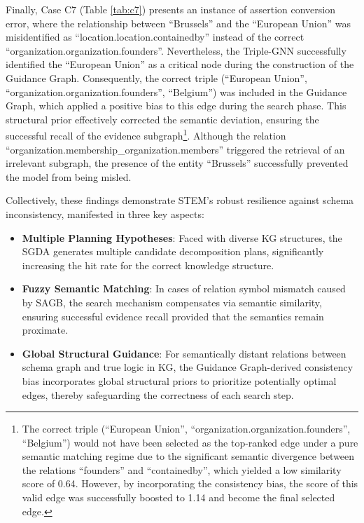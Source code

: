 \documentclass[11pt]{article}
\begin{document}
Finally, Case C7 (Table \ref{tab:c7}) presents an instance of assertion conversion error, where the relationship between ``Brussels'' and the ``European Union'' was misidentified as ``location.location.containedby'' instead of the correct ``organization.organization.founders''. Nevertheless, the Triple-GNN successfully identified the ``European Union'' as a critical node during the construction of the Guidance Graph. Consequently, the correct triple (``European Union'', ``organization.organization.founders'', ``Belgium'') was included in the Guidance Graph, which applied a positive bias to this edge during the search phase. This structural prior effectively corrected the semantic deviation, ensuring the successful recall of the evidence subgraph\footnote{The correct triple (``European Union'', ``organization.organization.founders'', ``Belgium'') would not have been selected as the top-ranked edge under a pure semantic matching regime due to the significant semantic divergence between the relations ``founders'' and ``containedby'', which yielded a low similarity score of 0.64. However, by incorporating the consistency bias, the score of this valid edge was successfully boosted to 1.14 and become the final selected edge.}. Although the relation ``organization.membership\_organization.members'' triggered the retrieval of an irrelevant subgraph, the presence of the entity ``Brussels'' successfully prevented the model from being misled.

Collectively, these findings demonstrate STEM's robust resilience against schema inconsistency, manifested in three key aspects:
\begin{itemize}
\item \textbf{Multiple Planning Hypotheses}: Faced with diverse KG structures, the SGDA generates multiple candidate decomposition plans, significantly increasing the hit rate for the correct knowledge structure.
\item \textbf{Fuzzy Semantic Matching}: In cases of relation symbol mismatch caused by SAGB, the search mechanism compensates via semantic similarity, ensuring successful evidence recall provided that the semantics remain proximate.
\item \textbf{Global Structural Guidance}: For semantically distant relations between schema graph and true logic in KG, the Guidance Graph-derived consistency bias incorporates global structural priors to prioritize potentially optimal edges, thereby safeguarding the correctness of each search step.
\end{itemize}
\end{document}
